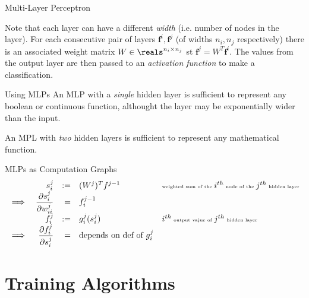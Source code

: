 \documentclass[11pt,a4paper]{article}
\begin{document}
\begin{definition}{Multi-Layer Perceptron}
\begin{center}
\end{center}
  Note that each layer can have a different \textit{width} (i.e. number of nodes in the layer). For each consecutive pair of layers $\pmb{f}^i,\pmb{f}^j$ (of widths $n_i,n_j$ respectively) there is an associated weight matrix $W\in\reals^{n_i\times n_j}$ st $\pmb{f}^j=W^T\pmb{f}^i$.
  \var The values from the output layer are then passed to an \textit{activation function} to make a classification. %
\end{definition}

\begin{remark}{Using MLPs}
  An MLP with a \textit{single} hidden layer is sufficient to represent any boolean or continuous function, althought the layer may be exponentially wider than the input.
  \par An MPL with \textit{two} hidden layers is sufficient to represent any mathematical function.
\end{remark}

\begin{proposition}{MLPs as Computation Graphs}
  \[\begin{array}{rrrll}
    &s_i^j&:=&(W^j)^Tf^{j-1}&\tiny \text{weighted sum of the }i^{th}\text{ node of the }j^{th}\text{ hidden layer}\\
    \implies&\dfrac{\partial s_i^j}{\partial w_{ii}^j}&=&f_i^{j-1}\\
    &f_i^j&:=&g_i^j(s_i^j)&\tiny i^{th}\text{ output vajue of }j^{th}\text{ hidden layer}\\
    \implies&\dfrac{\partial f_i^j}{\partial s_i^j}&=&\text{depends on def of }g_i^j
  \end{array}\]

\end{proposition}

\section{Training Algorithms}
\end{document}
